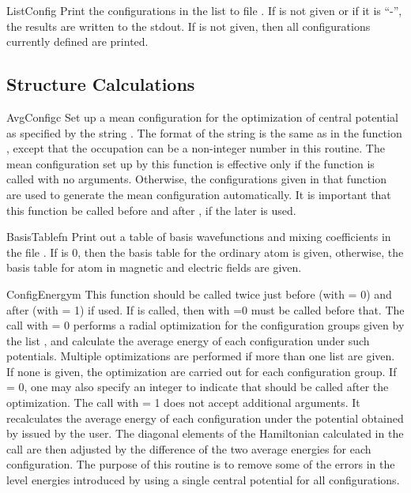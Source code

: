 \begin{fundesc}{ListConfig}{}
Print the configurations in the list  to file . If  is
not given or if it is ``-'', the results are written to the stdout. If 
is not given, then all configurations currently defined are printed.
\end{fundesc}


\subsection{Structure Calculations}

\begin{fundesc}{AvgConfig}{c}
Set up a mean configuration for the optimization of central potential as
specified by the string . The format of the string is the same as in the
function , except that the occupation can be a non-integer
number in this routine. The mean configuration set up by this function is
effective only if the function  is called with no
arguments. Otherwise, the configurations given in that function are used to
generate the mean configuration automatically. It is important that this
function be called before  and after
, if the later is used.
\end{fundesc}

\begin{fundesc}{BasisTable}{fn}
Print out a table of basis wavefunctions and mixing coefficients in the file
. If  is 0, then the basis table for the ordinary atom is
given, otherwise, the basis table for atom in magnetic and electric fields are
given.
\end{fundesc}

\begin{fundesc}{ConfigEnergy}{m}
This function should be called twice just before (with  = 0) and after
(with  = 1)  if used. If  is
called, then  with =0 must be called before that.
The call with  = 0 performs a radial optimization for the configuration
groups given by the list , and calculate the average energy of each
configuration under such potentials. Multiple optimizations are performed if
more than one list are given. If none is given, the optimization are carried out
for each configuration group. If  = 0, one may also specify an integer
 to indicate that  should be called after the
optimization. The call with  = 1 does not accept additional arguments. It
recalculates the average energy of each configuration under the potential
obtained by  issued by the user. The diagonal elements
of the Hamiltonian calculated in the  call are then adjusted
by the difference of the two average energies for each configuration. The
purpose of this routine is to remove some of the errors in the level energies
introduced by using a single central potential for all configurations.
\end{fundesc}

